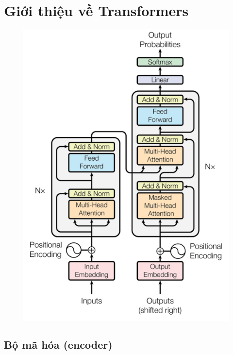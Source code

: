 \documentclass{book}
\begin{document}
    \section{Giới thiệu về Transformers}
    \begin{figure}[H]
        \centering
        \includegraphics[width=0.5\linewidth]{images/12d_2.png}

    \end{figure}
        \subsection{Bộ mã hóa (encoder)}
\end{document}
